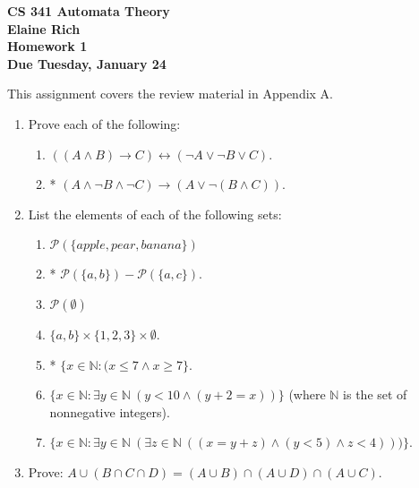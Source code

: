 \documentclass[10pt]{article}
\newcommand{\nat}{\mathbb{N}}
\begin{document}
\begin{center}
\textbf{CS 341 Automata Theory \\
Elaine Rich \\
Homework 1 \\
Due Tuesday, January 24}
\end{center}
This assignment covers the review material in Appendix A.
\begin{enumerate}


\item
Prove each of the following:
\begin{enumerate}

\item
$((A \land B) \rightarrow C) \leftrightarrow (\lnot A \lor \lnot B \lor C)$. \\

\item
* $(A \land \lnot B \land \lnot C) \rightarrow (A \lor \lnot (B \land C))$.

\end{enumerate}



\item
List the elements of each of the following sets:
\begin{enumerate}

\item
$\mathcal{P} (\{apple, pear, banana\})$

\item
* $\mathcal{P} (\{a, b\}) - \mathcal{P} (\{a, c\})$.

\item
$\mathcal{P} (\emptyset)$

\item
$\{a, b\} \times \{1, 2, 3\} \times \emptyset$.

\item
* $\{x \in \nat: (x \leq 7 \land x \geq 7\}$.

\item
$\{x \in \nat: \exists y \in \nat \> (y < 10 \land (y + 2 = x))\}$ (where $\nat$ is the set of nonnegative integers).

\item
$\{x \in \nat: \exists y \in \nat \> (\exists z \in \nat \> ((x = y + z) \land (y < 5) \land z < 4)))\}$.
\end{enumerate}



\item
Prove: $A \cup (B \cap C \cap D) = (A \cup B) \cap (A \cup D) \cap (A \cup C)$.


\end{enumerate}
\end{document}
